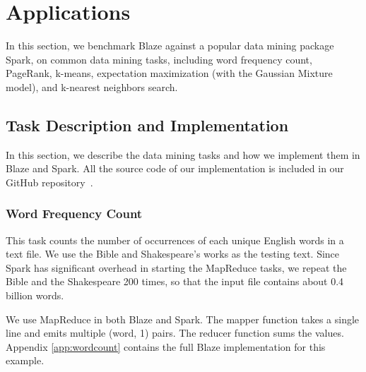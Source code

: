 \section{Applications}
\label{sec:app}

In this section, we benchmark Blaze against a popular data mining package Spark, on common data mining tasks, including word frequency count, PageRank, k-means, expectation maximization (with the Gaussian Mixture model), and k-nearest neighbors search.

\subsection{Task Description and Implementation}

In this section, we describe the data mining tasks and how we implement them in Blaze and Spark.
All the source code of our implementation is included in our GitHub repository~\cite{blaze}.

\subsubsection{Word Frequency Count}

This task counts the number of occurrences of each unique English words in a text file.
We use the Bible and Shakespeare's works as the testing text.
Since Spark has significant overhead in starting the MapReduce tasks, we repeat the Bible and the Shakespeare 200 times, so that the input file contains about 0.4 billion words.

We use MapReduce in both Blaze and Spark.
The mapper function takes a single line and emits multiple (word, 1) pairs.
The reducer function sums the values.
Appendix \ref{app:wordcount} contains the full Blaze implementation for this example.

